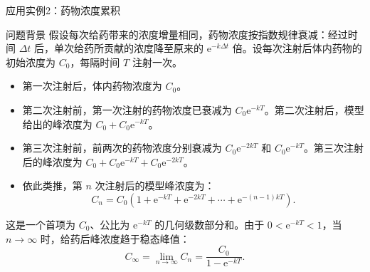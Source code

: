 \documentclass[aspectratio=169,10pt]{ctexbeamer}
\newcommand{\ee}{\mathrm{e}}
\begin{document}
\begin{frame}{应用实例2：药物浓度累积}
	\begin{block}{问题背景}
		假设每次给药带来的浓度增量相同，药物浓度按指数规律衰减：经过时间 \(\Delta t\) 后，单次给药所贡献的浓度降至原来的 \(\ee^{-k\Delta t}\) 倍。设每次注射后体内药物的初始浓度为 \(C_0\)，每隔时间 \(T\) 注射一次。
	\end{block}
	
	\pause
	
	\begin{itemize}
		\item 第一次注射后，体内药物浓度为 \(C_0\)。
		\item 第二次注射前，第一次注射的药物浓度已衰减为 \(C_0\ee^{-kT}\)。第二次注射后，模型给出的峰浓度为 \(C_0+C_0\ee^{-kT}\)。
		\item 第三次注射前，前两次的药物浓度分别衰减为 \(C_0\ee^{-2kT}\) 和 \(C_0\ee^{-kT}\)。第三次注射后的峰浓度为 \(C_0+C_0\ee^{-kT}+C_0\ee^{-2kT}\)。
		\item 依此类推，第 \(n\) 次注射后的模型峰浓度为：
		\[
		C_n=C_0\left(1+\ee^{-kT}+\ee^{-2kT}+\cdots+\ee^{-(n-1)kT}\right).
		\]
	\end{itemize}
	
	这是一个首项为 \(C_0\)、公比为 \(\ee^{-kT}\) 的几何级数部分和。由于 \(0<\ee^{-kT}<1\)，当 \(n\to\infty\) 时，给药后峰浓度趋于稳态峰值：
	\[
	C_{\infty}=\lim_{n\to\infty}C_n=\frac{C_0}{1-\ee^{-kT}}.
	\]
	

	

\end{frame}
\end{document}
